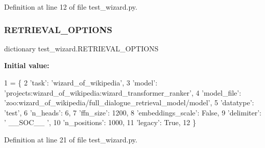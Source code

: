 Definition at line 12 of file test\+\_\+wizard.\+py.

\mbox{\label{namespacetest__wizard_a007066f16642cc2aa5f021c2d4b2e794}} 
\subsubsection{\texorpdfstring{R\+E\+T\+R\+I\+E\+V\+A\+L\+\_\+\+O\+P\+T\+I\+O\+NS}{RETRIEVAL\_OPTIONS}}
{\footnotesize\ttfamily dictionary test\+\_\+wizard.\+R\+E\+T\+R\+I\+E\+V\+A\+L\+\_\+\+O\+P\+T\+I\+O\+NS}

{\bfseries Initial value\+:}
\begin{DoxyCode}
1 =  \{
2     \textcolor{stringliteral}{'task'}: \textcolor{stringliteral}{'wizard\_of\_wikipedia'},
3     \textcolor{stringliteral}{'model'}: \textcolor{stringliteral}{'projects:wizard\_of\_wikipedia:wizard\_transformer\_ranker'},
4     \textcolor{stringliteral}{'model\_file'}: \textcolor{stringliteral}{'zoo:wizard\_of\_wikipedia/full\_dialogue\_retrieval\_model/model'},
5     \textcolor{stringliteral}{'datatype'}: \textcolor{stringliteral}{'test'},
6     \textcolor{stringliteral}{'n\_heads'}: 6,
7     \textcolor{stringliteral}{'ffn\_size'}: 1200,
8     \textcolor{stringliteral}{'embeddings\_scale'}: \textcolor{keyword}{False},
9     \textcolor{stringliteral}{'delimiter'}: \textcolor{stringliteral}{' \_\_SOC\_\_ '},
10     \textcolor{stringliteral}{'n\_positions'}: 1000,
11     \textcolor{stringliteral}{'legacy'}: \textcolor{keyword}{True},
12 \}
\end{DoxyCode}


Definition at line 21 of file test\+\_\+wizard.\+py.

